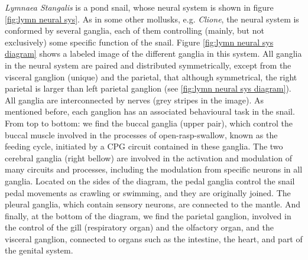 \textit{Lymnaea Stangalis} is a pond snail, whose neural system is shown in figure \ref{fig:lymn neural sys}. As in some other mollusks, e.g. {\sl Clione}, the neural system is conformed by several ganglia, each of them controlling (mainly, but not exclusively) some specific function of the snail. Figure \ref{fig:lymn neural sys diagram} shows a labeled image of the different ganglia in this system. All ganglia in the neural system are paired and distributed symmetrically, except from the visceral ganglion (unique) and the parietal, that although symmetrical, the right parietal is larger than left parietal ganglion (see \ref{fig:lymn neural sys diagram}). All ganglia are interconnected by nerves (grey stripes in the image). As mentioned before, each ganglion has an associated behavioural task in the snail. From top to bottom: we find the buccal ganglia (upper pair), which control the buccal muscle involved in the processes of open-rasp-swallow, known as the feeding cycle, initiated by a CPG circuit contained in these ganglia. The two cerebral ganglia (right bellow) are involved in the activation and modulation of many circuits and processes, including the modulation from specific neurons in all ganglia. Located on the sides of the diagram, the pedal ganglia control the snail pedal movements as crawling or swimming, and they are originally joined. The pleural ganglia, which contain sensory neurons, are connected to the mantle. And finally, at the bottom of the diagram, we find the parietal ganglion, involved in the control of the gill (respiratory organ) and the olfactory organ, and the visceral ganglion, connected to organs such as the intestine, the heart, and part of the genital system.


